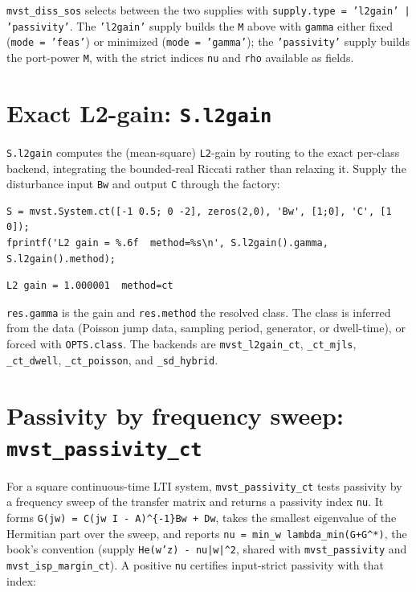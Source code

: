 \documentclass[11pt,oneside]{report}
\newcommand{\code}[1]{\texttt{#1}}
\begin{document}
\code{mvst\_diss\_sos} selects between the two supplies with
\code{supply.type = 'l2gain' | 'passivity'}. The \code{'l2gain'} supply builds the \code{M}
above with \code{gamma} either fixed (\code{mode = 'feas'}) or minimized
(\code{mode = 'gamma'}); the \code{'passivity'} supply builds the port-power \code{M}, with the
strict indices \code{nu} and \code{rho} available as fields.

\hypertarget{exact-l2-gain-s.l2gain}{%
\section{\texorpdfstring{Exact L2-gain: \code{S.l2gain}}{Exact L2-gain: S.l2gain}}\label{exact-l2-gain-s.l2gain}}

\code{S.l2gain} computes the (mean-square) \code{L2}-gain by routing to the exact
per-class backend, integrating the bounded-real Riccati rather than relaxing it.
Supply the disturbance input \code{Bw} and output \code{C} through the factory:

\begin{lstlisting}[style=matlabstyle]
S = mvst.System.ct([-1 0.5; 0 -2], zeros(2,0), 'Bw', [1;0], 'C', [1 0]);
fprintf('L2 gain = %.6f  method=%s\n', S.l2gain().gamma, S.l2gain().method);
\end{lstlisting}

\begin{lstlisting}[style=outputstyle]
L2 gain = 1.000001  method=ct
\end{lstlisting}

\code{res.gamma} is the gain and \code{res.method} the resolved class. The class is
inferred from the data (Poisson jump data, sampling period, generator, or
dwell-time), or forced with \code{OPTS.class}. The backends are
\code{mvst\_l2gain\_ct}, \code{\_ct\_mjls}, \code{\_ct\_dwell}, \code{\_ct\_poisson}, and \code{\_sd\_hybrid}.

\hypertarget{passivity-by-frequency-sweep-mvst_passivity_ct}{%
\section{\texorpdfstring{Passivity by frequency sweep: \code{mvst\_passivity\_ct}}{Passivity by frequency sweep: mvst\_passivity\_ct}}\label{passivity-by-frequency-sweep-mvst_passivity_ct}}

For a square continuous-time LTI system, \code{mvst\_passivity\_ct} tests passivity by
a frequency sweep of the transfer matrix and returns a passivity index \code{nu}. It
forms \code{G(jw) = C(jw I - A)\^{}\{-1\}Bw + Dw}, takes the smallest eigenvalue of the
Hermitian part over the sweep, and reports \code{nu = min\_w lambda\_min(G+G\^{}*)}, the
book's convention (supply \code{He(w'z) - nu|w|\^{}2}, shared with \code{mvst\_passivity} and
\code{mvst\_isp\_margin\_ct}). A positive \code{nu} certifies input-strict passivity with
that index:
\end{document}
